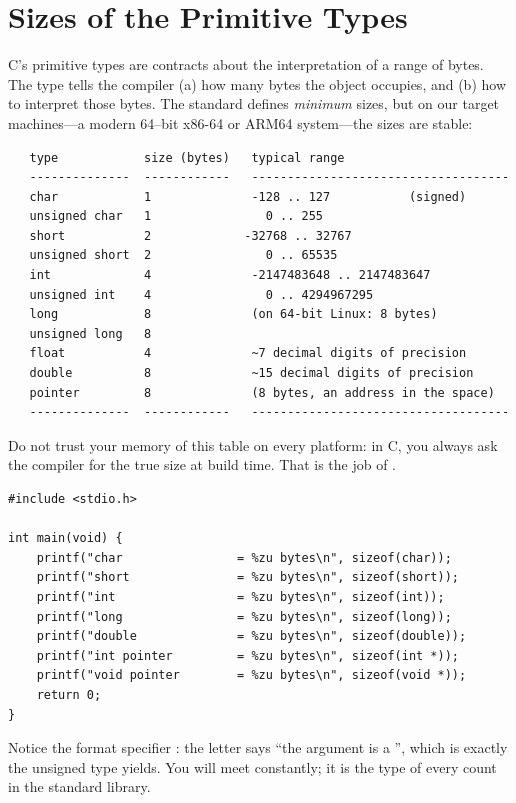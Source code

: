 \section{Sizes of the Primitive Types}

C's primitive types are contracts about the interpretation of a range of
bytes. The type tells the compiler (a) how many bytes the object
occupies, and (b) how to interpret those bytes. The standard defines
\emph{minimum} sizes, but on our target machines---a modern 64--bit
x86-64 or ARM64 system---the sizes are stable:

\begin{verbatim}
   type            size (bytes)   typical range
   --------------  ------------   ------------------------------------
   char            1              -128 .. 127           (signed)
   unsigned char   1                0 .. 255
   short           2             -32768 .. 32767
   unsigned short  2                0 .. 65535
   int             4              -2147483648 .. 2147483647
   unsigned int    4                0 .. 4294967295
   long            8              (on 64-bit Linux: 8 bytes)
   unsigned long   8
   float           4              ~7 decimal digits of precision
   double          8              ~15 decimal digits of precision
   pointer         8              (8 bytes, an address in the space)
   --------------  ------------   ------------------------------------
\end{verbatim}

Do not trust your memory of this table on every platform: in C, you
always ask the compiler for the true size at build time. That is the
job of .

\begin{lstlisting}[caption={Sizes as reported by the compiler itself.}]
#include <stdio.h>

int main(void) {
    printf("char                = %zu bytes\n", sizeof(char));
    printf("short               = %zu bytes\n", sizeof(short));
    printf("int                 = %zu bytes\n", sizeof(int));
    printf("long                = %zu bytes\n", sizeof(long));
    printf("double              = %zu bytes\n", sizeof(double));
    printf("int pointer         = %zu bytes\n", sizeof(int *));
    printf("void pointer        = %zu bytes\n", sizeof(void *));
    return 0;
}
\end{lstlisting}

Notice the format specifier : the letter  says
``the argument is a '', which is exactly the unsigned
type  yields. You will meet  constantly;
it is the type of every count in the standard library.

